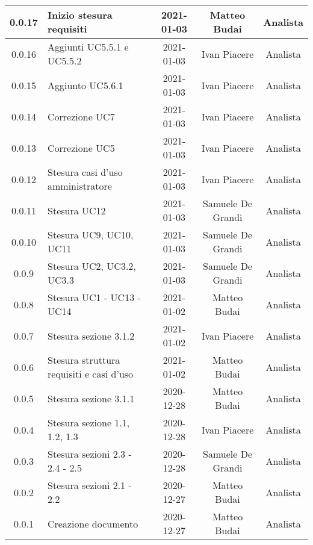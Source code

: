 \begin{center}
\begin{longtable}{|c|p{5cm}|c|c|c|}
		\hline
		0.0.17 & Inizio stesura requisiti & 2021-01-03 & Matteo Budai & Analista \\
		\hline
		0.0.16 & Aggiunti UC5.5.1 e UC5.5.2 & 2021-01-03 & Ivan Piacere & Analista \\
		\hline
		0.0.15 & Aggiunto UC5.6.1 & 2021-01-03 & Ivan Piacere & Analista \\
		\hline
		0.0.14 & Correzione UC7 & 2021-01-03 & Ivan Piacere & Analista \\
		\hline
		0.0.13 & Correzione UC5 & 2021-01-03 & Ivan Piacere & Analista \\
		\hline
		0.0.12 & Stesura casi d'uso amministratore & 2021-01-03 & Ivan Piacere & Analista \\
		\hline
		0.0.11 & Stesura UC12  & 2021-01-03 & Samuele De Grandi & Analista \\
		\hline
	    0.0.10 & Stesura UC9, UC10, UC11  & 2021-01-03 & Samuele De Grandi & Analista \\
		\hline
		0.0.9 & Stesura UC2, UC3.2, UC3.3  & 2021-01-03 & Samuele De Grandi & Analista \\
		\hline
		0.0.8 & Stesura UC1 - UC13 - UC14 & 2021-01-02 & Matteo Budai & Analista \\
		\hline
		0.0.7 & Stesura sezione 3.1.2 & 2021-01-02 & Ivan Piacere & Analista\\
		\hline
		0.0.6 & Stesura struttura requisiti e casi d'uso & 2021-01-02 & Matteo Budai & Analista \\
		\hline
		0.0.5 & Stesura sezione 3.1.1 & 2020-12-28 & Matteo Budai & Analista \\
		\hline
		0.0.4 & Stesura sezione 1.1, 1.2, 1.3 & 2020-12-28 & Ivan Piacere & Analista \\
		\hline
		0.0.3 & Stesura sezioni 2.3 - 2.4 - 2.5 & 2020-12-28 & Samuele De Grandi & Analista \\
		\hline
		0.0.2 & Stesura sezioni 2.1 - 2.2 & 2020-12-27 & Matteo Budai & Analista \\
		\hline
		0.0.1 & Creazione documento & 2020-12-27 & Matteo Budai & Analista \\
		\hline
		
	\end{longtable}
\end{center}
